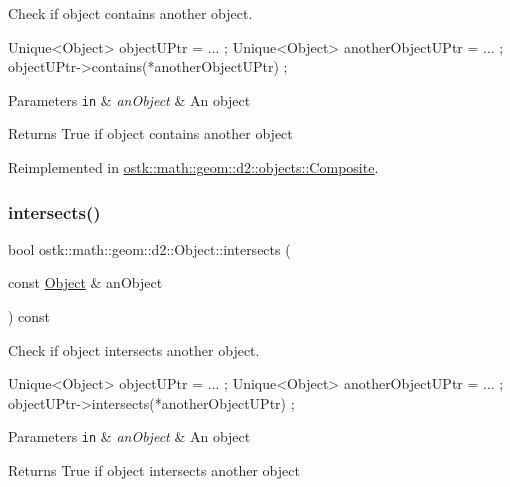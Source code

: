 Check if object contains another object. 


\begin{DoxyCode}
Unique<Object> objectUPtr = ... ;
Unique<Object> anotherObjectUPtr = ... ;
objectUPtr->contains(*anotherObjectUPtr) ;
\end{DoxyCode}



\begin{DoxyParams}[1]{Parameters}
\mbox{\tt in}  & {\em an\+Object} & An object \\
\hline
\end{DoxyParams}
\begin{DoxyReturn}{Returns}
True if object contains another object 
\end{DoxyReturn}


Reimplemented in \hyperlink{classostk_1_1math_1_1geom_1_1d2_1_1objects_1_1_composite_a4a07c3111b7ca79b2e0d5ec2d52b2ef1}{ostk\+::math\+::geom\+::d2\+::objects\+::\+Composite}.

\mbox{\label{classostk_1_1math_1_1geom_1_1d2_1_1_object_a8791f58dd95e68a1eb4271aa15f7cd12}} 
\subsubsection{\texorpdfstring{intersects()}{intersects()}}
{\footnotesize\ttfamily bool ostk\+::math\+::geom\+::d2\+::\+Object\+::intersects (\begin{DoxyParamCaption}\item[{const \hyperlink{classostk_1_1math_1_1geom_1_1d2_1_1_object}{Object} \&}]{an\+Object }\end{DoxyParamCaption}) const\hspace{0.3cm}{\ttfamily [virtual]}}



Check if object intersects another object. 


\begin{DoxyCode}
Unique<Object> objectUPtr = ... ;
Unique<Object> anotherObjectUPtr = ... ;
objectUPtr->intersects(*anotherObjectUPtr) ;
\end{DoxyCode}



\begin{DoxyParams}[1]{Parameters}
\mbox{\tt in}  & {\em an\+Object} & An object \\
\hline
\end{DoxyParams}
\begin{DoxyReturn}{Returns}
True if object intersects another object 
\end{DoxyReturn}


